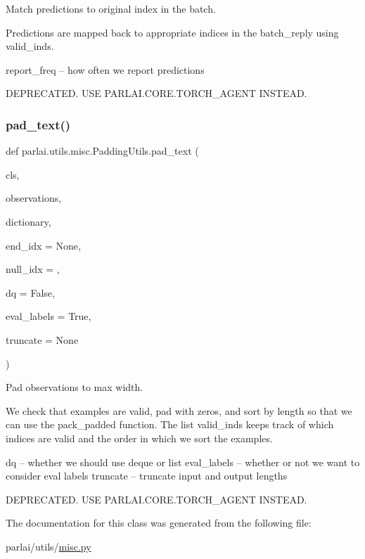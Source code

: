 \begin{DoxyVerb}Match predictions to original index in the batch.

Predictions are mapped back to appropriate indices in the batch_reply
using valid_inds.

report_freq -- how often we report predictions

DEPRECATED. USE PARLAI.CORE.TORCH_AGENT INSTEAD.
\end{DoxyVerb}
 \mbox{\label{classparlai_1_1utils_1_1misc_1_1PaddingUtils_acd7178452139c55dc56e9889b10347cc}} 
\subsubsection{\texorpdfstring{pad\+\_\+text()}{pad\_text()}}
{\footnotesize\ttfamily def parlai.\+utils.\+misc.\+Padding\+Utils.\+pad\+\_\+text (\begin{DoxyParamCaption}\item[{}]{cls,  }\item[{}]{observations,  }\item[{}]{dictionary,  }\item[{}]{end\+\_\+idx = {\ttfamily None},  }\item[{}]{null\+\_\+idx = {},  }\item[{}]{dq = {\ttfamily False},  }\item[{}]{eval\+\_\+labels = {\ttfamily True},  }\item[{}]{truncate = {\ttfamily None} }\end{DoxyParamCaption})}

\begin{DoxyVerb}Pad observations to max width.

We check that examples are valid, pad with zeros, and sort by length
so that we can use the pack_padded function. The list valid_inds
keeps track of which indices are valid and the order in which we sort
the examples.

dq -- whether we should use deque or list
eval_labels -- whether or not we want to consider eval labels
truncate -- truncate input and output lengths

DEPRECATED. USE PARLAI.CORE.TORCH_AGENT INSTEAD.
\end{DoxyVerb}
 

The documentation for this class was generated from the following file\+:\begin{DoxyCompactItemize}
\item 
parlai/utils/\hyperlink{misc_8py}{misc.\+py}\end{DoxyCompactItemize}
